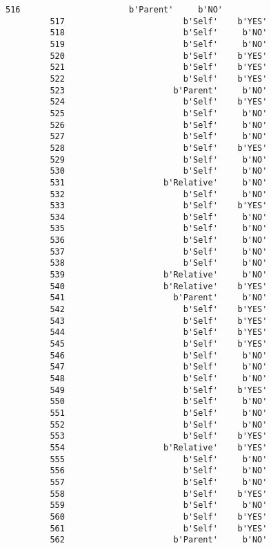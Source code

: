 \documentclass[11pt]{article}
\begin{document}
\begin{Verbatim}[commandchars=\\\{\}]
         516                      b'Parent'     b'NO'  
         517                        b'Self'    b'YES'  
         518                        b'Self'     b'NO'  
         519                        b'Self'     b'NO'  
         520                        b'Self'    b'YES'  
         521                        b'Self'    b'YES'  
         522                        b'Self'    b'YES'  
         523                      b'Parent'     b'NO'  
         524                        b'Self'    b'YES'  
         525                        b'Self'     b'NO'  
         526                        b'Self'     b'NO'  
         527                        b'Self'     b'NO'  
         528                        b'Self'    b'YES'  
         529                        b'Self'     b'NO'  
         530                        b'Self'     b'NO'  
         531                    b'Relative'     b'NO'  
         532                        b'Self'     b'NO'  
         533                        b'Self'    b'YES'  
         534                        b'Self'     b'NO'  
         535                        b'Self'     b'NO'  
         536                        b'Self'     b'NO'  
         537                        b'Self'     b'NO'  
         538                        b'Self'     b'NO'  
         539                    b'Relative'     b'NO'  
         540                    b'Relative'    b'YES'  
         541                      b'Parent'     b'NO'  
         542                        b'Self'    b'YES'  
         543                        b'Self'    b'YES'  
         544                        b'Self'    b'YES'  
         545                        b'Self'    b'YES'  
         546                        b'Self'     b'NO'  
         547                        b'Self'     b'NO'  
         548                        b'Self'     b'NO'  
         549                        b'Self'    b'YES'  
         550                        b'Self'     b'NO'  
         551                        b'Self'     b'NO'  
         552                        b'Self'     b'NO'  
         553                        b'Self'    b'YES'  
         554                    b'Relative'    b'YES'  
         555                        b'Self'     b'NO'  
         556                        b'Self'     b'NO'  
         557                        b'Self'     b'NO'  
         558                        b'Self'    b'YES'  
         559                        b'Self'     b'NO'  
         560                        b'Self'    b'YES'  
         561                        b'Self'    b'YES'  
         562                      b'Parent'     b'NO'  

\end{Verbatim}
\end{document}

